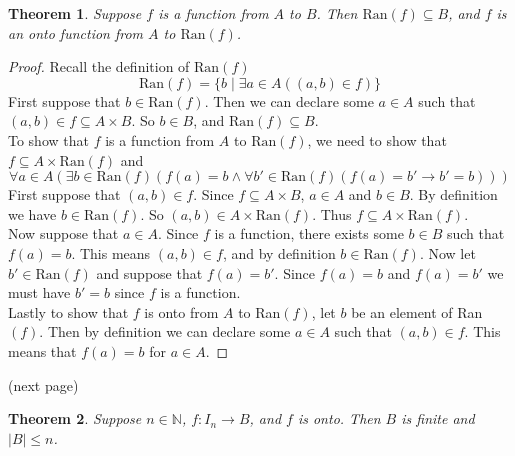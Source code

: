 \documentclass{report}
\newtheorem*{theorem}{Theorem}
\theoremstyle{definition}
\begin{document}
\begin{theorem}
Suppose $f$ is a function from $A$ to $B$. Then $\text{Ran}(f)\subseteq B$, 
and $f$ is an onto function from $A$ to $\text{Ran}(f)$.
\end{theorem}
\begin{proof}
Recall the definition of $\text{Ran}(f)$
\begin{equation*}
\text{Ran}(f)=\{b\mid\exists a\in A((a,b)\in f)\}
\end{equation*}
First suppose that $b\in\text{Ran}(f)$. Then we can declare some $a\in A$ such that $(a,b)\in f\subseteq A\times B$.
So $b\in B$, and $\text{Ran}(f)\subseteq B$.\\
\indent To show that $f$ is a function from $A$ to $\text{Ran}(f)$, we need to show that 
$f\subseteq A\times\text{Ran}(f)$ and
\begin{equation*}
\forall a\in A(\exists b\in\text{Ran}(f)(f(a)=b\land\forall b'\in\text{Ran}(f)(f(a)=b'\to b'=b)))
\end{equation*}
First suppose that $(a,b)\in f$. Since $f\subseteq A\times B$, $a\in A$ and $b\in B$. By definition we have
$b\in\text{Ran}(f)$. So $(a,b)\in A\times\text{Ran}(f)$. Thus $f\subseteq A\times\text{Ran}(f)$.\\
\indent Now suppose that $a\in A$. Since $f$ is a function, there exists some $b\in B$ such that $f(a)=b$. 
This means $(a,b)\in f$, and by definition $b\in\text{Ran}(f)$. Now let $b'\in\text{Ran}(f)$ and suppose that
$f(a)=b'$. Since $f(a)=b$ and $f(a)=b'$ we must have $b'=b$ since $f$ is a function.\\
\indent Lastly to show that $f$ is onto from $A$ to Ran$(f)$, let $b$ be an element of Ran$(f)$. 
Then by definition we can declare some $a\in A$ such that $(a,b)\in f$. This means that $f(a)=b$ for $a\in A$.
\end{proof}
\noindent(next page)
\newpage
\begin{theorem}
Suppose $n\in\mathbb N$, $f:I_n\to B$, and $f$ is onto. Then $B$ is finite and $|B|\leq n$.
\end{theorem}
\end{document}

